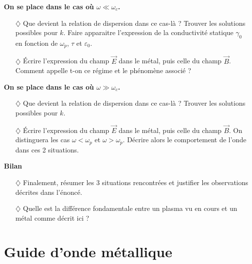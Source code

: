 \documentclass{report}
\begin{document}
\textbf{On se place dans le cas où $\omega\ll\omega_c$.}

\begin{itemize}

	\item[$\diamondsuit$] Que devient la relation de dispersion dans ce cas-là ? Trouver les solutions possibles pour $k$. Faire apparaitre l'expression de la conductivité statique $\gamma_0$ en fonction de $\omega_p$, $\tau$ et $\varepsilon_0$.

	\item[$\diamondsuit$] Écrire l'expression du champ $\vec{E}$ dans le métal, puis celle du champ $\vec{B}$. Comment appelle t-on ce régime et le phénomène associé ? 

\end{itemize}

\textbf{On se place dans le cas où $\omega\gg\omega_c$.}

\begin{itemize}

	\item[$\diamondsuit$] Que devient la relation de dispersion dans ce cas-là ? Trouver les solutions possibles pour $k$.
	
	\item[$\diamondsuit$] Écrire l'expression du champ $\vec{E}$ dans le métal, puis celle du champ $\vec{B}$. On distinguera les cas $\omega<\omega_p$ et $\omega>\omega_p$. Décrire alors le comportement de l'onde dans ces 2 situations.

\end{itemize}

\textbf{Bilan}

\begin{itemize}

	\item[$\diamondsuit$] Finalement, résumer les 3 situations rencontrées et justifier les observations décrites dans l'énoncé.

	\item[$\diamondsuit$] Quelle est la différence fondamentale entre un plasma vu en cours et un métal comme décrit ici ?

\end{itemize}

\newpage

\section*{Guide d'onde métallique}
\end{document}
